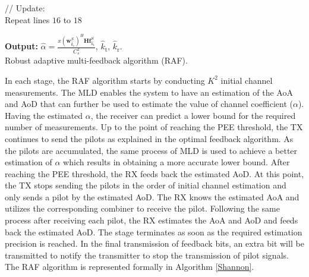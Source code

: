 \documentclass{ieeeaccess}
\begin{document}
\begin{algorithm}
{// Update:\\
Repeat lines $16$ to $18$\\


}

\textbf{Output:}
$\hat{\alpha} =  \frac{x (\boldsymbol{w}^S_{\hat{k}_\textrm{r}})^H\boldsymbol{H}\boldsymbol{f}^S_{\hat{k}_\textrm{t}}}{C^2_{s} }$, $\hat{k}_\textrm{t}$, $\hat{k}_\textrm{r}$.\\
\caption{Robust adaptive multi-feedback algorithm (RAF).}
\label{Shannon}
\end{algorithm}



In each stage, the RAF algorithm starts by conducting $K^2$ initial channel measurements. The MLD enables the system to have an estimation of the AoA and AoD that can further be used to estimate the value of channel coefficient ($\alpha$). Having the estimated $\alpha$, the receiver can predict a lower bound for the required number of measurements. Up to the point of reaching the PEE threshold, the TX continues to send the pilots as explained in the optimal feedback algorithm. As the pilots are accumulated, the same process of MLD is used to achieve a better estimation of $\alpha$ which results in obtaining a more accurate lower bound. After reaching the PEE threshold, the RX feeds back the estimated AoD. At this point, the TX stops sending the pilots in the order of initial channel estimation and only sends a pilot by the estimated AoD. The RX knows the estimated AoA and utilizes the corresponding combiner to receive the pilot. Following the same process after receiving each pilot, the RX estimates the AoA and AoD and feeds back the estimated AoD. The stage terminates as soon as the required estimation precision is reached. In the final transmission of feedback bits, an extra bit will be transmitted to notify the transmitter to stop the transmission of pilot signals. The RAF algorithm is represented formally in Algorithm \ref{Shannon}.
\end{document}
